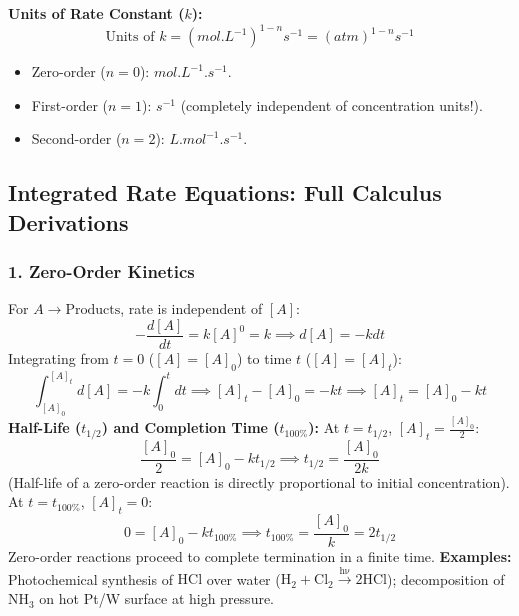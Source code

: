 \documentclass[10pt,twoside,openright]{book}
\begin{document}
\textbf{Units of Rate Constant ($k$):}
\begin{equation}
  \text{Units of } k = \left(\si{mol.L^{-1}}\right)^{1 - n} \si{s^{-1}} = \left(\si{atm}\right)^{1 - n} \si{s^{-1}}
\end{equation}
\begin{itemize}
  \item Zero-order ($n=0$): $\si{mol.L^{-1}.s^{-1}}$.
  \item First-order ($n=1$): $\si{s^{-1}}$ (completely independent of concentration units!).
  \item Second-order ($n=2$): $\si{L.mol^{-1}.s^{-1}}$.
\end{itemize}

\subsection{Integrated Rate Equations: Full Calculus Derivations}

\subsubsection{1. Zero-Order Kinetics}
For $A \to \text{Products}$, rate is independent of $[A]$:
\begin{equation}
  -\frac{d[A]}{dt} = k [A]^0 = k \implies d[A] = -k dt
\end{equation}
Integrating from $t = 0$ ($[A] = [A]_0$) to time $t$ ($[A] = [A]_t$):
\begin{equation}
  \int_{[A]_0}^{[A]_t} d[A] = -k \int_0^t dt \implies [A]_t - [A]_0 = -kt \implies [A]_t = [A]_0 - kt
\end{equation}
\textbf{Half-Life ($t_{1/2}$) and Completion Time ($t_{100\%}$):}
At $t = t_{1/2}$, $[A]_t = \frac{[A]_0}{2}$:
\begin{equation}
  \frac{[A]_0}{2} = [A]_0 - k t_{1/2} \implies t_{1/2} = \frac{[A]_0}{2k}
\end{equation}
(Half-life of a zero-order reaction is directly proportional to initial concentration).
At $t = t_{100\%}$, $[A]_t = 0$:
\begin{equation}
  0 = [A]_0 - k t_{100\%} \implies t_{100\%} = \frac{[A]_0}{k} = 2 t_{1/2}
\end{equation}
Zero-order reactions proceed to complete termination in a finite time.
\textbf{Examples:} Photochemical synthesis of $\mathrm{HCl}$ over water ($\mathrm{H_2 + Cl_2 \xrightarrow{h\nu} 2HCl}$); decomposition of $\mathrm{NH_3}$ on hot Pt/W surface at high pressure.
\end{document}
